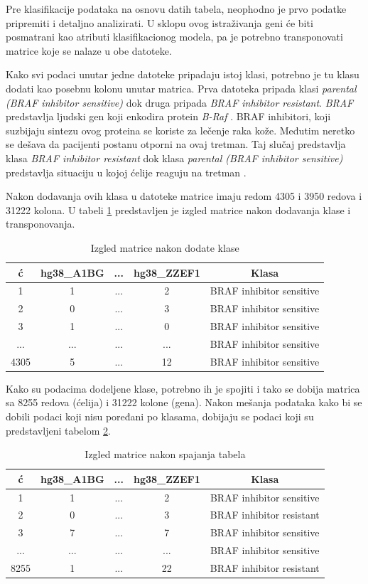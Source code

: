 \documentclass[a4paper]{article}
\begin{document}
Pre klasifikacije podataka na osnovu datih tabela, neophodno je prvo podatke pripremiti i detaljno analizirati. 
U sklopu ovog istraživanja geni će biti posmatrani kao atributi klasifikacionog modela, pa je potrebno transponovati matrice koje se nalaze u obe datoteke.

Kako svi podaci unutar jedne datoteke pripadaju istoj klasi, potrebno je tu klasu dodati kao posebnu kolonu unutar matrica. Prva datoteka pripada klasi \textit{parental (BRAF inhibitor sensitive)} dok druga pripada \textit{BRAF inhibitor resistant}. \textit{BRAF} predstavlja ljudski gen koji enkodira protein \textit{B-Raf} \cite{braf}.
BRAF inhibitori, koji suzbijaju sintezu ovog proteina se koriste za lečenje raka kože. Međutim neretko se dešava da pacijenti postanu otporni na ovaj tretman. Taj slučaj predstavlja klasa \textit{BRAF inhibitor resistant} dok klasa \textit{parental (BRAF inhibitor sensitive)} predstavlja situaciju u kojoj ćelije reaguju na tretman \cite{therapy}.

Nakon dodavanja ovih klasa u datoteke matrice imaju redom 4305 i 3950 redova i 31222 kolona. U tabeli \ref{table:2} predstavljen je izgled matrice nakon dodavanja klase i transponovanja.

\begin{table}[h!]
\centering
\begin{tabular}{|c c c c c|} 
 \hline
  ć & hg38\_A1BG & ... & hg38\_ZZEF1 & Klasa \\ [0.5ex] 
 \hline
 1 & 1  & ... & 2 & BRAF inhibitor sensitive \\ 
 2 & 0  & ... & 3 & BRAF inhibitor sensitive \\
 3 & 1  & ... & 0 & BRAF inhibitor sensitive \\
 ... &  ... & ... & ... & BRAF inhibitor sensitive \\
 4305 & 5 & ... & 12 & BRAF inhibitor sensitive \\  [1ex] 
 \hline
\end{tabular}
\caption{Izgled matrice nakon dodate klase}
\label{table:2}
\end{table}

Kako su podacima dodeljene klase, potrebno ih je spojiti i tako se dobija matrica sa 8255 redova (ćelija) i 31222 kolone (gena). Nakon mešanja podataka kako bi se dobili podaci koji nisu poređani po klasama, dobijaju se podaci koji su predstavljeni tabelom \ref{table:3}.


\begin{table}[h!]
\centering
\begin{tabular}{|c c c c c|} 
 \hline
  ć & hg38\_A1BG & ... & hg38\_ZZEF1 & Klasa \\ [0.5ex] 
 \hline
 1 & 1  & ... & 2 & BRAF inhibitor sensitive \\ 
 2 & 0  & ... & 3 & BRAF inhibitor resistant \\
 3 & 7  & ... & 7 & BRAF inhibitor sensitive \\
 ... &  ... & ... & ... & BRAF inhibitor sensitive \\
 8255 & 1 & ... & 22 & BRAF inhibitor resistant \\  [1ex] 
 \hline
\end{tabular}
\caption{Izgled matrice nakon spajanja tabela}
\label{table:3}
\end{table}
\end{document}
